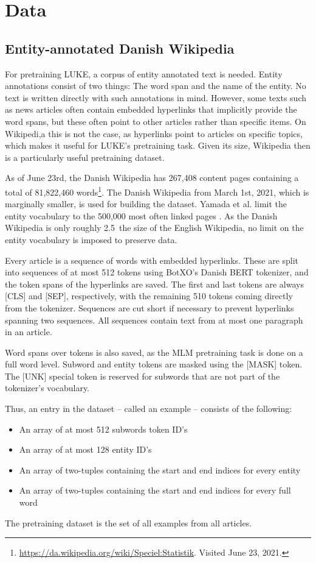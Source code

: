 \documentclass[main.tex]{subfiles}
\begin{document}
\chapter{Data}
\label{chap:data}

\section{Entity-annotated Danish Wikipedia}
\label{sec:dawiki}
For pretraining LUKE, a corpus of entity annotated text is needed.
Entity annotations consist of two things: The word span and the name of the entity.
No text is written directly with such annotations in mind.
However, some texts such as news articles often contain embedded hyperlinks that implicitly provide the word spans, but these often point to other articles rather than specific items.
On Wikipedi,a this is not the case, as hyperlinks point to articles on specific topics, which makes it useful for LUKE's pretraining task.
Given its size, Wikipedia then is a particularly useful pretraining dataset.

As of June 23rd, the Danish Wikipedia has 267,408 content pages containing a total of 81,822,460 words\footnote{\url{https://da.wikipedia.org/wiki/Speciel:Statistik}. Visited June 23, 2021.}.
The Danish Wikipedia from March 1st, 2021, which is marginally smaller, is used for building the dataset.
Yamada et al. limit the entity vocabulary to the 500,000 most often linked pages \cite{yamada2020luke}.
As the Danish Wikipedia is only roughly 2.5\pro\ the size of the English Wikipedia, no limit on the entity vocabulary is imposed to preserve data.

Every article is a sequence of words with embedded hyperlinks.
These are split into sequences of at most 512 tokens using BotXO's Danish BERT tokenizer, and the token spans of the hyperlinks are saved.
The first and last tokens are always [CLS] and [SEP], respectively, with the remaining 510 tokens coming directly from the tokenizer.
Sequences are cut short if necessary to prevent hyperlinks spanning two sequences.
All sequences contain text from at most one paragraph in an article.

Word spans over tokens is also saved, as the MLM pretraining task is done on a full word level.
Subword and entity tokens are masked using the [MASK] token.
The [UNK] special token is reserved for subwords that are not part of the tokenizer's vocabulary.

Thus, an entry in the dataset -- called an example -- consists of the following:
\begin{itemize}
    \item An array of at most 512 subwords token ID's
    \item An array of at most 128 entity ID's
    \item An array of two-tuples containing the start and end indices for every entity
    \item An array of two-tuples containing the start and end indices for every full word
\end{itemize}
The pretraining dataset is the set of all examples from all articles.
\end{document}
